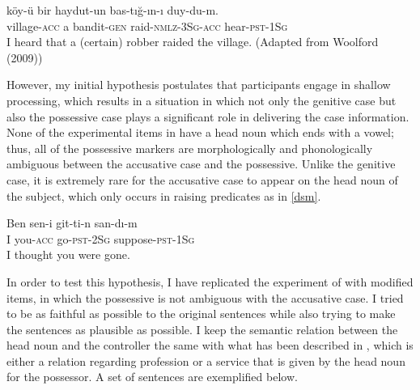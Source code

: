 \documentclass[doc]{apa6}
\begin{document}
\begin{exe}
\ex \label{gensubj}
\gll k\"{o}y-\"{u} bir haydut-un bas-t{\i}\u{g}-{\i}n-{\i} duy-du-m.\\
village-\textsc{acc} a bandit-\textsc{gen} raid-\textsc{nmlz}-\textsc{3Sg}-\textsc{acc} hear-\textsc{pst}-\textsc{1Sg}\\
\glt I heard that a (certain) robber raided the village. (Adapted from Woolford (2009))
\end{exe}

However, my initial hypothesis postulates that participants engage in shallow processing, which results in a situation in which not only the genitive case but also the possessive case plays a significant role in delivering the case information. None of the experimental items in \textcite{Lago2018} have a head noun which ends with a vowel; thus, all of the possessive markers are morphologically and phonologically ambiguous between the accusative case and the possessive. Unlike the genitive case, it is extremely rare for the accusative case to appear on the head noun of the subject, which only occurs in raising predicates as in \autoref{dsm}.

\begin{exe}
\ex \label{dsm}
\gll Ben sen-i git-ti-n san-d{\i}-m\\
I you-\textsc{acc} go-\textsc{pst}-\textsc{2Sg} suppose-\textsc{pst}-\textsc{1Sg}\\
\glt I thought you were gone.
\end{exe}

In order to test this hypothesis, I have replicated the experiment of \textcite{Lago2018} with modified items, in which the possessive is not ambiguous with the accusative case. I tried to be as faithful as possible to the original sentences while also trying to make the sentences as plausible as possible. I keep the semantic relation between the head noun and the controller the same with what has been described in \textcite{Lago2018}, which is either a relation regarding profession or a service that is given by the head noun for the possessor. A set of sentences are exemplified below.
\end{document}
